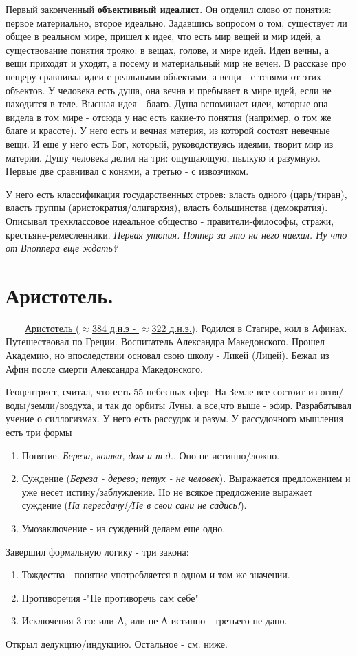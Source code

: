 Первый законченный \textbf{объективный идеалист}. Он отделил слово от понятия: первое материально, второе идеально. Задавшись вопросом о том, существует ли общее в реальном мире, пришел к идее, что есть мир вещей и мир идей, а существование понятия трояко: в вещах, голове, и мире идей. Идеи вечны, а вещи приходят и уходят, а посему и материальный мир не вечен. В рассказе про пещеру сравнивал идеи с реальными объектами, а вещи - с тенями от этих объектов. У человека есть душа, она вечна и пребывает в мире идей, если не находится в теле. Высшая идея - благо. Душа вспоминает идеи, которые она видела в том мире - отсюда у нас есть какие-то понятия (например, о том же благе и красоте).
У него есть и вечная материя, из которой состоят невечные вещи. И еще у него есть Бог, который, руководствуясь идеями, творит мир из материи. Душу человека делил на три: ощущающую, пылкую и разумную. Первые две сравнивал с конями, а третью - с извозчиком.

У него есть классификация государственных строев: власть одного (царь/тиран), власть группы (аристократия/олигархия), власть большинства (демократия). Описывал трехклассовое идеальное общество - правители-философы, стражи, крестьяне-ремесленники. \textit{Первая утопия. Поппер за это на него наехал. Ну что от Впоппера еще ждать?}

\section{Аристотель.}
\ \ \ \
\underline{Аристотель ($\approx$384 д.н.э - $\approx$322 д.н.э.)}. Родился в Стагире, жил в Афинах. Путешествовал по Греции. Воспитатель Александра Македонского. Прошел Академию, но впоследствии основал свою школу - Ликей (Лицей). Бежал из Афин после смерти Александра Македонского.

Геоцентрист, считал, что есть 55 небесных сфер. На Земле все состоит из огня/воды/земли/воздуха, и так до орбиты Луны, а все,что выше - эфир. 
Разрабатывал учение о силлогизмах. У него есть рассудок и разум. У рассудочного мышления есть три формы
\begin{enumerate}
\item Понятие. \textit{Береза, кошка, дом и т.д.}. Оно не истинно/ложно.
\item Суждение (\textit{Береза - дерево; петух - не человек}). Выражается предложением и уже несет истину/заблуждение. Но не всякое предложение выражает суждение (\textit{На пересдачу!/Не в свои сани не садись!}). 
\item Умозаключение - из суждений делаем еще одно. 
\end{enumerate}
Завершил формальную логику - три закона:
\begin{enumerate}
\item Тождества - понятие употребляется в одном и том же значении.
\item Противоречия -"Не противоречь сам себе"
\item Исключения 3-го: или А, или не-А истинно - третьего не дано. 
\end{enumerate}
Открыл дедукцию/индукцию.
Остальное - см. ниже.

